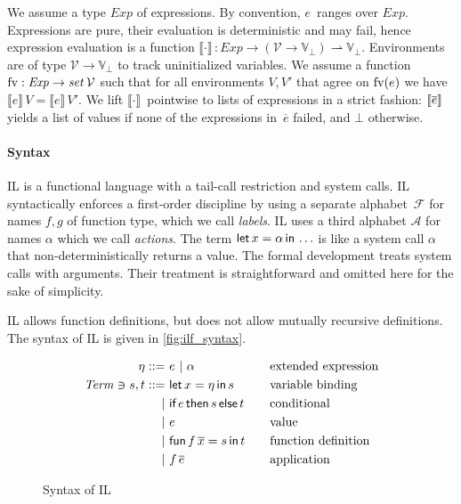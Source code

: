 \documentclass[openright,a4paper,11pt]{scrartcl}
\newcommand{\slist}[1]{\ensuremath{\overline{#1}}}
\newcommand{\denot}[1]{\ensuremath{\llbracket #1 \rrbracket}}
\newcommand{\M}[1]{\ensuremath{\mathit{#1}}}
\newcommand{\pto}{\ensuremath{\rightharpoonup}}
\newcommand{\Exp}{\ensuremath{\M{Exp}}}
\newcommand{\Trm}{\ensuremath{\M{Term}}}
\newcommand{\Fun}{\ensuremath{\mathcal{F}}}
\newcommand{\Act}{\ensuremath{\mathcal{A}}}
\newcommand{\Var}{\ensuremath{\mathcal{V}}}
\newcommand{\Valb}{\ensuremath{\mathbb{V}_{\bot}}}
\newcommand{\fv}{\ensuremath{\textup{fv}}}
\newcommand{\ilIn}{\textsf{in}}
\newcommand{\ilLetRec}[4]{\textsf{fun}\,#1\,#2=#3\,\ilIn\,#4}
\newcommand{\ilLet}[3]{\textsf{let}\,#1=#2\,\ilIn\,#3}
\newcommand{\ilIf}[3]{\textsf{if}\,{#1}\,\textsf{then}\,{#2}\,\textsf{else}\,{#3}}
\newcommand{\opeval}[2]{\ensuremath{\denot{#1}\,#2}}
\newcommand{\myref}[1]{\autoref{#1}}
\theoremstyle{plain}
\theoremstyle{plain}
\theoremstyle{plain}
\theoremstyle{plain}
\theoremstyle{nonumberplain}
\begin{document}
We assume a type $\Exp$ of expressions.
By convention, $e$~ranges over \Exp.
Expressions are pure, their evaluation is deterministic and may fail, hence
expression evaluation is a function $\opeval{\cdot}{}:\Exp\to(\Var\to\Valb)\pto\Valb$.
Environments are of type $\Var\to\Valb$ to track uninitialized variables.
We assume a function $\fv:\Exp\to\M{set}\,\Var$ such that for all environments $V,V'$
that agree on $\fv(e)$ we have $\opeval{e}{V}=\opeval{e}{V'}$.
We lift $\opeval{\cdot}{}$ pointwise to lists of expressions in a strict fashion: $\opeval{\slist{e}}$ yields a list of values if none of the expressions in~$\slist{e}$ failed, and $\bot$ otherwise.


\label{chap:il}
\paragraph{Syntax}
IL is a functional language with a tail-call restriction and system calls.
IL syntactically enforces a first-order discipline by using a separate
alphabet~$\Fun$ for names $f,g$ of function type, which we call \emph{labels}.
IL uses a third alphabet $\Act$ for names $\alpha$ which we call \emph{actions}.
The term $\ilLet{x}{\extevt}{\ldots}$ is like a system call $\alpha$ that non-deterministically returns a value. The formal development treats system calls with arguments.
Their treatment is straightforward and omitted here for the sake of simplicity.

IL allows function definitions, but does not allow mutually recursive definitions.
The syntax of IL is given in \myref{fig:ilf_syntax}.

\newcommand{\extexp}{\ensuremath{\eta}}
\begin{figure}[t]
  \centering
\begin{align*}
\eta ::=&~e~|~\extevt&&\quad\textup{extended expression}\\
\Trm\ni{}s,t ::=&~\ilLet{x}{\extexp}{s}&&\quad\textup{variable binding}\\
   |&~\ilIf{e}{s}{t}&&\quad\textup{conditional}\\
   |&~e&&\quad\textup{value}\\
   |&~\ilLetRec{f}{\slist{x}}{s}{t}&&\quad\textup{function definition}\\
   |&~f\,\slist{e}&&\quad\textup{application}
\end{align*}
  \caption{Syntax of IL}
  \label{fig:ilf_syntax}
\end{figure}
\end{document}
